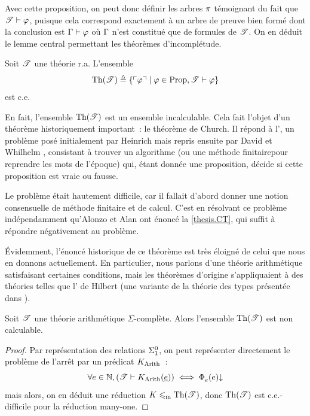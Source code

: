 Avec cette proposition, on peut donc définir les arbres $\pi$ témoignant du
fait que $\mathscr T \vdash \varphi$, puisque cela correspond exactement à
un arbre de preuve bien formé dont la conclusion est $\Gamma\vdash \varphi$ où
$\Gamma$ n'est constitué que de formules de $\mathscr T$. On en déduit le
lemme central permettant les théorèmes d'incomplétude.

\begin{lemma}
  Soit $\mathscr T$ une théorie r.a. L'ensemble
  \[\operatorname{Th}(\mathscr T) \triangleq
  \left\{ \ulcorner\varphi\urcorner \;\middle\vert\; \varphi\in\operatorname{Prop},\mathscr T\vdash\varphi \right\}\]
  est c.e.
\end{lemma}

En fait, l'ensemble $\operatorname{Th}(\mathscr T)$ est un ensemble incalculable. Cela fait
l'objet d'un théorème historiquement important~: le théorème de Church. Il
répond à l',
un problème posé initialement par Heinrich 
\cite{MancosuZach2015}
mais repris ensuite par David  et Whilhelm 
\cite{HilbertAckermann1967},
consistant à trouver un algorithme (ou une \og méthode finitaire\fg pour
reprendre les mots de l'époque) qui, étant donnée une proposition, décide si
cette proposition est vraie ou fausse.

Le problème était hautement difficile, car il fallait d'abord donner une notion
consensuelle de méthode finitaire et de calcul. C'est en résolvant ce problème
indépendamment qu'Alonzo  et Alan  ont énoncé la
\cref{thesis.CT}, qui suffit à répondre négativement au problème.

\'Evidemment, l'énoncé historique de ce théorème est très éloigné de celui que
nous en donnons actuellement. En particulier, nous parlons d'une théorie
arithmétique satisfaisant certaines conditions, mais les théorèmes d'origine
s'appliquaient à des théories telles que
l' de Hilbert (une variante de la théorie
des types présentée dans
\cite{WhiteheadRussell1910,WhiteheadRussell1912,WhiteheadRussell1913}).

\begin{theorem}
  Soit $\mathscr T$ une théorie arithmétique $\Sigma$-complète. Alors l'ensemble
  $\operatorname{Th}(\mathscr T)$ est non calculable.
\end{theorem}

\begin{proof}
  Par représentation des relations $\Sigma^0_{1}$, on peut représenter
  directement le problème de l'arrêt par un prédicat $K_{\operatorname{Arith}}$~:
  \[\forall e \in \mathbb N,
  (\mathscr T \vdash K_{\operatorname{Arith}}(\underline{e})) \iff \operatorname{\Phi}_{e}^{}(e)\mathbin{\downarrow}\]
  mais alors, on en déduit une réduction
  $K \leqslant_{\mathrm{m}}\operatorname{Th}(\mathscr T)$, donc $\operatorname{Th}(\mathscr T)$ est
  c.e.-difficile pour la réduction many-one.
\end{proof}

